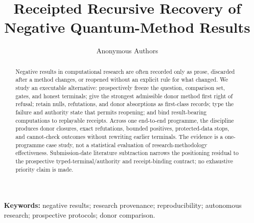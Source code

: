 \documentclass{article}
\title{Receipted Recursive Recovery of Negative Quantum-Method Results}
\author{Anonymous Authors}
\begin{document}
\maketitle

\begin{abstract}
Negative results in computational research are often recorded only as prose, discarded after a method changes, or reopened without an explicit rule for what changed. We study an executable alternative: prospectively freeze the question, comparison set, gates, and honest terminals; give the strongest admissible donor method first right of refusal; retain nulls, refutations, and donor absorptions as first-class records; type the failure and authority state that permits reopening; and bind result-bearing computations to replayable receipts. Across one end-to-end programme, the discipline produces donor closures, exact refutations, bounded positives, protected-data stops, and cannot-check outcomes without rewriting earlier terminals. The evidence is a one-programme case study, not a statistical evaluation of research-methodology effectiveness. Submission-date literature subtraction narrows the positioning residual to the prospective typed-terminal/authority and receipt-binding contract; no exhaustive priority claim is made.
\end{abstract}

\noindent\textbf{Keywords:} negative results; research provenance; reproducibility; autonomous research; prospective protocols; donor comparison.













\end{document}
